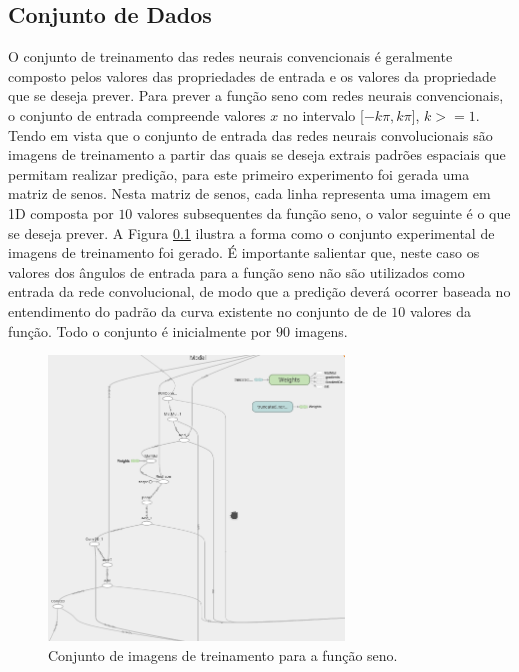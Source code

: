 \documentclass[a4paper,10pt]{report}
\begin{document}
\subsection{Conjunto de Dados}
O conjunto de treinamento das redes neurais convencionais é geralmente composto
pelos valores das propriedades de entrada e os valores da propriedade que se
deseja prever. Para prever a função seno com redes neurais convencionais, o
conjunto de entrada compreende valores $x$ no intervalo [$-k\pi,k\pi$],
$k >= 1$. Tendo em vista que o conjunto de entrada das redes neurais convolucionais
são imagens de treinamento a partir das quais se deseja extrais padrões espaciais
que permitam realizar predição, para este primeiro experimento foi gerada uma
matriz de senos. Nesta matriz de senos, cada linha representa uma imagem em 1D
composta por $10$ valores subsequentes da função seno, o valor seguinte é o que se
deseja prever. A Figura \ref{} ilustra a forma como o conjunto experimental de imagens
de treinamento foi gerado. É importante salientar que, neste caso os valores dos ângulos de entrada para a função
seno não são utilizados como entrada da rede convolucional, de modo que a predição
deverá ocorrer baseada no entendimento do padrão da curva existente no conjunto de
de $10$ valores da função. Todo o conjunto é inicialmente por $90$ imagens.

\begin{figure}[htp]
\begin{center}
  \includegraphics[width=0.7\textwidth]{cnn_model}
  \caption{Conjunto de imagens de treinamento para a função seno.}
  \label{fig:sinFunc}
\end{center}
\end{figure}
\end{document}
